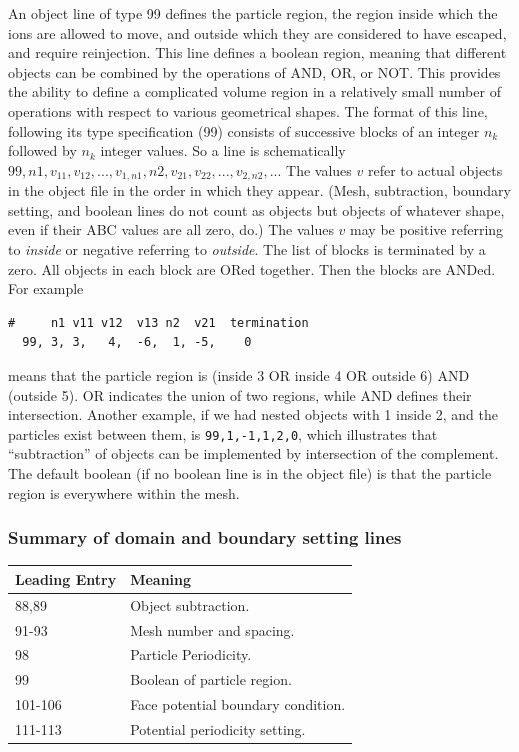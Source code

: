 \documentclass[12pt]{article}
\begin{document}
An object line of type 99 defines the particle region, the region
inside which the ions are allowed to move, and outside which they are
considered to have escaped, and require reinjection. This line defines
a boolean region, meaning that different objects can be combined by
the operations of AND, OR, or NOT. This provides the ability to define
a complicated volume region in a relatively small number of operations
with respect to various geometrical shapes. The format of this line,
following its type specification (99) consists of successive blocks of
an integer $n_k$ followed by $n_k$ integer values. So a line is
schematically
$99,n1,v_{11},v_{12},...,v_{1,n1},n2,v_{21},v_{22},...,v_{2,n2},...$
The values $v$ refer to actual objects in the object file in the order
in which they appear. (Mesh, subtraction, boundary setting, and boolean lines do
not count as objects but objects of whatever shape, even if their ABC
values are all zero, do.)  The values $v$ may be positive referring to
\emph{inside} or negative referring to \emph{outside}. The list of
blocks is terminated by a zero. All objects in each block are ORed
together. Then the blocks are ANDed. For example
\begin{verbatim}
#     n1 v11 v12  v13 n2  v21  termination
  99, 3, 3,   4,  -6,  1, -5,    0
\end{verbatim}
means that the particle region is (inside 3 OR inside 4 OR outside 6)
AND (outside 5). OR indicates the union of two regions, while AND defines
their intersection. Another example, if we had nested objects with 1
inside 2, and the particles exist between them, is
\verb!99,1,-1,1,2,0!, which illustrates that ``subtraction'' of
objects can be implemented by intersection of the complement.  The
default boolean (if no boolean line is in the object file) is that the
particle region is everywhere within the mesh.

\subsubsection*{Summary of domain and boundary setting lines}

\par
\begin{tabular}{|l|l|}
\hline
Leading Entry & Meaning\\
\hline
88,89    & Object subtraction.\\
91-93    & Mesh number and spacing.\\
98       & Particle Periodicity.\\
99       & Boolean of particle region.\\
101-106  & Face potential boundary condition.\\
111-113  & Potential periodicity setting.\\
\hline
\end{tabular}
\end{document}
